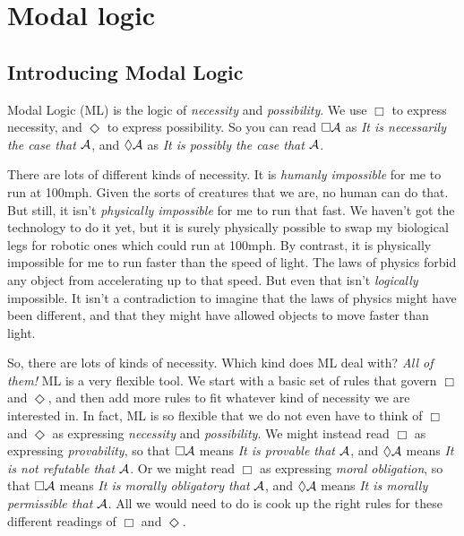 
\part{Modal logic}
\label{ch.ML}

%

\chapter{Introducing Modal Logic}
\label{Intro}

Modal Logic (ML) is the logic of \emph{necessity} and \emph{possibility}. We use $\Box$ to express necessity, and $\Diamond$ to express possibility. So you can read $\Box \mathcal{A}$ as \emph{It is necessarily the case that} $\mathcal{A}$, and $\Diamond \mathcal{A}$ as \emph{It is possibly the case that} $\mathcal{A}$.

There are lots of different kinds of necessity. It is \emph{humanly impossible} for me to run at 100mph. Given the sorts of creatures that we are, no human can do that. But still, it isn't \emph{physically impossible} for me to run that fast. We haven't got the technology to do it yet, but it is surely physically possible to swap my biological legs for robotic ones which could run at 100mph. By contrast, it is physically impossible for me to run faster than the speed of light. The laws of physics forbid any object from accelerating up to that speed. But even that isn't \emph{logically} impossible. It isn't a contradiction to imagine that the laws of physics might have been different, and that they might have allowed objects to move faster than light.

So, there are lots of kinds of necessity. Which kind does ML deal with? \emph{All of them!} ML is a very flexible tool. We start with a basic set of rules that govern $\Box$ and $\Diamond$, and then add more rules to fit whatever kind of necessity we are interested in. In fact, ML is so flexible that we do not even have to think of $\Box$ and $\Diamond$ as expressing \emph{necessity} and \emph{possibility}. We might instead read $\Box$ as expressing \emph{provability}, so that $\Box\mathcal{A}$ means \emph{It is provable that} $\mathcal{A}$, and $\Diamond\mathcal{A}$ means \emph{It is not refutable that} $\mathcal{A}$. Or we might read $\Box$ as expressing \emph{moral obligation}, so that $\Box \mathcal{A}$ means \emph{It is morally obligatory that} $\mathcal{A}$, and $\Diamond \mathcal{A}$ means \emph{It is morally permissible that} $\mathcal{A}$. All we would need to do is cook up the right rules for these different readings of $\Box$ and $\Diamond$.

